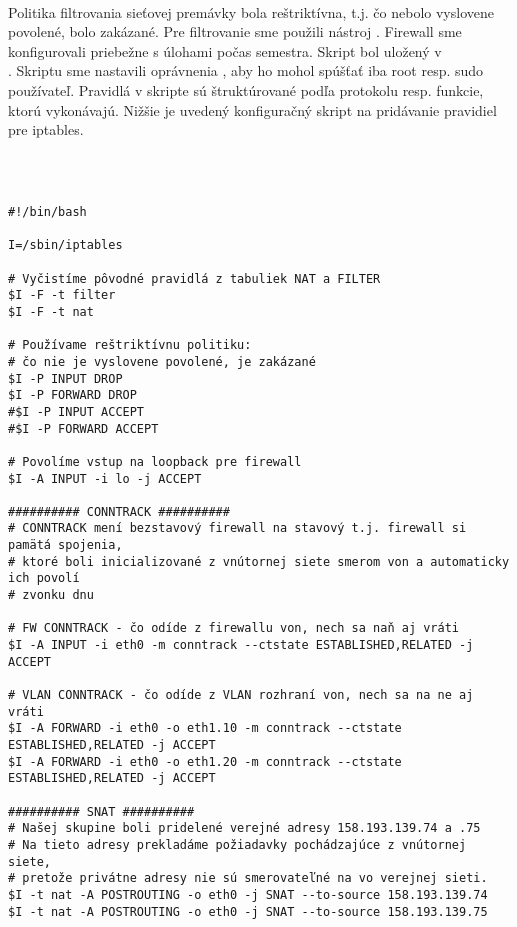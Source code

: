 \paragraph{}
Politika filtrovania sieťovej premávky bola reštriktívna, t.j. čo nebolo vyslovene povolené, bolo zakázané. Pre filtrovanie sme použili nástroj . Firewall sme konfigurovali priebežne s úlohami počas semestra. Skript bol uložený v\\ . Skriptu sme nastavili oprávnenia , aby ho mohol spúšťať iba root resp. sudo používateľ. Pravidlá v skripte sú štruktúro\-vané podľa protokolu resp. funkcie, ktorú vykonávajú. Nižšie je uvedený konfiguračný skript na pridávanie pravidiel pre iptables.

\noindent
{\selectfont
\\

\begin{small}

\begin{verbatim}

#!/bin/bash

I=/sbin/iptables

# Vyčistíme pôvodné pravidlá z tabuliek NAT a FILTER
$I -F -t filter
$I -F -t nat

# Používame reštriktívnu politiku:
# čo nie je vyslovene povolené, je zakázané
$I -P INPUT DROP
$I -P FORWARD DROP
#$I -P INPUT ACCEPT
#$I -P FORWARD ACCEPT

# Povolíme vstup na loopback pre firewall
$I -A INPUT -i lo -j ACCEPT

########## CONNTRACK ##########
# CONNTRACK mení bezstavový firewall na stavový t.j. firewall si pamätá spojenia,
# ktoré boli inicializované z vnútornej siete smerom von a automaticky ich povolí
# zvonku dnu

# FW CONNTRACK - čo odíde z firewallu von, nech sa naň aj vráti
$I -A INPUT -i eth0 -m conntrack --ctstate ESTABLISHED,RELATED -j ACCEPT

# VLAN CONNTRACK - čo odíde z VLAN rozhraní von, nech sa na ne aj vráti
$I -A FORWARD -i eth0 -o eth1.10 -m conntrack --ctstate ESTABLISHED,RELATED -j ACCEPT
$I -A FORWARD -i eth0 -o eth1.20 -m conntrack --ctstate ESTABLISHED,RELATED -j ACCEPT

########## SNAT ##########
# Našej skupine boli pridelené verejné adresy 158.193.139.74 a .75
# Na tieto adresy prekladáme požiadavky pochádzajúce z vnútornej siete,
# pretože privátne adresy nie sú smerovateľné na vo verejnej sieti.
$I -t nat -A POSTROUTING -o eth0 -j SNAT --to-source 158.193.139.74
$I -t nat -A POSTROUTING -o eth0 -j SNAT --to-source 158.193.139.75


\end{verbatim}
\end{small}}
